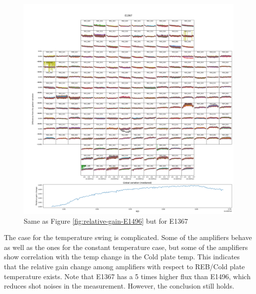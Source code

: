 \begin{figure}[ht]
    \centering
    \includegraphics[width=1\linewidth]{figures/gaintemp/E1367gainoverall_global.png}
    \caption{Same as Figure \ref{fig:relative-gain-E1496} but for E1367}
    \label{fig:relative-gain-E1367}
\end{figure} 
The case for the temperature swing is complicated. Some of the amplifiers behave as well as the ones for the constant temperature case, but some of the amplifiers show correlation with the temp change in the Cold plate temp. This indicates that the relative gain change among amplifiers with respect to REB/Cold plate temperature exists. 
Note that E1367 has a 5 times higher flux than E1496, which reduces shot noises in the measurement. However, the conclusion still holds. 

